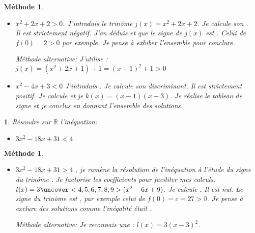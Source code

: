 \documentclass{beamer}
\newtheorem{exercise}[theorem]{\translate{Exercise}}
\newtheorem{methode}[theorem]{{Méthode}}
\begin{document}
  \begin{frame}
  \begin{methode}
    \begin{itemize}
     \item $x^2+2x+2>0$. J'introduis le trinôme $j(x)=x^2+2x+2$. Je calcule son 
     . 
     Il est strictement négatif. J'en déduis 
      et que le signe de
     $j(x)$ est . Celui de $f(0)=2>0$ par exemple. Je pense
     à exhiber l'ensemble 
     pour conclure.
     
     Méthode alternative: J'utilise : 
     $j(x)=(x^2+2x+1)+1=(x+1)^2+1>0$
     \item $x^2-4 x+3<0$ J'introduis . Je calcule son discriminant.
     Il est strictement positif. Je calcule 
     et je 
     $k(x)=(x-1)(x-3)$. Je réalise le tableau de signe et je conclus en donnant
     l'ensemble des solutions.
   \end{itemize}
 \end{methode}
\end{frame}

  \begin{frame}
  \begin{exercise}
    Résoudre sur $\mathbb{R}$ l'inéquation:
    \begin{itemize}
     \item $3x^2-18x+31<4$
   \end{itemize}    
  \end{exercise} 
  \end{frame}

  
  \begin{frame}
  \begin{methode}
    \begin{itemize}
      \item $3x^2-18x+31>4$ , 
      je ramène la résolution de l'inéquation à l'étude 
      du signe du trinôme 
     . Je 
      factorise les coefficients pour faciliter mes calculs: 
      $l(x)=3\uncover<4,5,6,7,8,9>{(x^2-6x+9)}$. Je calcule 
      . Il est nul. 
      Le signe du trinôme est , par exemple 
      celui de $f(0)=c=27>0$. Je pense à 
      exclure  des solutions 
      comme l'inégalité était . 
     
     Méthode alternative: Je reconnais une : $l(x)=3(x-3)^2$.
     
   \end{itemize}    
  \end{methode} 
  \end{frame}
  
\end{document}
